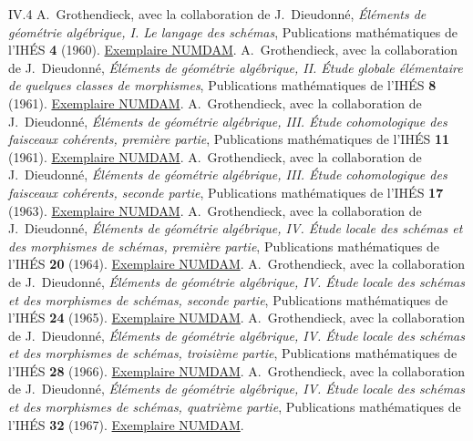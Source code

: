 \documentclass[11pt,a4paper]{article}
\begin{document}
\nocite{EGAIII2}

\begin{thebibliography}{IV.4}
 A.~Grothendieck, avec la collaboration de J.~Dieudonné,
\emph{Éléments de géométrie algébrique, I. Le langage des schémas},
Publications mathématiques de l'IHÉS \textbf{4} (1960).
\href{https://numdam.org/item/PMIHES_1960__4__5_0/}{Exemplaire NUMDAM}.
 A.~Grothendieck, avec la collaboration de J.~Dieudonné,
\emph{Éléments de géométrie algébrique, II. Étude globale élémentaire
de quelques classes de morphismes}, Publications mathématiques de
l'IHÉS \textbf{8} (1961).
\href{https://www.numdam.org/item/PMIHES_1961__8__5_0.pdf}{Exemplaire NUMDAM}.
 A.~Grothendieck, avec la collaboration de J.~Dieudonné,
\emph{Éléments de géométrie algébrique, III. Étude cohomologique des
faisceaux cohérents, première partie}, Publications mathématiques de
l'IHÉS \textbf{11} (1961).
\href{https://www.numdam.org/articles/10.1007/BF02684273/}{Exemplaire NUMDAM}.
 A.~Grothendieck, avec la collaboration de J.~Dieudonné,
\emph{Éléments de géométrie algébrique, III. Étude cohomologique des
faisceaux cohérents, seconde partie}, Publications mathématiques de
l'IHÉS \textbf{17} (1963).
\href{https://numdam.org/articles/10.1007/BF02684890/}{Exemplaire NUMDAM}.
 A.~Grothendieck, avec la collaboration de J.~Dieudonné,
\emph{Éléments de géométrie algébrique, IV. Étude locale des schémas et
des morphismes de schémas, première partie}, Publications mathématiques
de l'IHÉS \textbf{20} (1964).
\href{https://numdam.org/articles/10.1007/BF02684747/}{Exemplaire NUMDAM}.
 A.~Grothendieck, avec la collaboration de J.~Dieudonné,
\emph{Éléments de géométrie algébrique, IV. Étude locale des schémas et
des morphismes de schémas, seconde partie}, Publications mathématiques
de l'IHÉS \textbf{24} (1965).
\href{https://numdam.org/articles/10.1007/BF02684322/}{Exemplaire NUMDAM}.
 A.~Grothendieck, avec la collaboration de J.~Dieudonné,
\emph{Éléments de géométrie algébrique, IV. Étude locale des schémas et
des morphismes de schémas, troisième partie}, Publications mathématiques
de l'IHÉS \textbf{28} (1966).
\href{https://numdam.org/articles/10.1007/BF02684343/}{Exemplaire NUMDAM}.
 A.~Grothendieck, avec la collaboration de J.~Dieudonné,
\emph{Éléments de géométrie algébrique, IV. Étude locale des schémas et
des morphismes de schémas, quatrième partie}, Publications mathématiques
de l'IHÉS \textbf{32} (1967).
\href{https://numdam.org/articles/10.1007/BF02732123/}{Exemplaire NUMDAM}.
\end{thebibliography}
\end{document}
